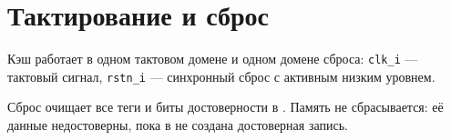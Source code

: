 \section{Тактирование и сброс}

Кэш работает в одном тактовом домене и одном домене сброса: \verb|clk_i| --- тактовый сигнал, \verb|rstn_i| --- синхронный сброс с активным низким уровнем.

Сброс очищает все теги и биты достоверности в \TagMemory. Память \DataMemory не сбрасывается: её данные недостоверны, пока в \TagMemory не создана достоверная запись.
